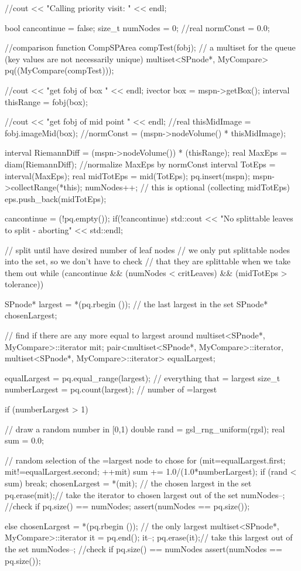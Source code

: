 \begin{DoxyCode}
{    
   //cout << "Calling priority visit: " << endl;

   bool cancontinue = false;
   size_t numNodes = 0;
   //real normConst = 0.0;
   
   //comparison function
   CompSPArea compTest(fobj);
   // a multiset for the queue (key values are not necessarily unique)
   multiset<SPnode*, MyCompare> pq((MyCompare(compTest)));

   //cout << "get fobj of box " << endl;
   ivector box = mspn->getBox();
   interval thisRange = fobj(box);
   
   //cout << "get fobj of mid point " << endl;
   //real thisMidImage = fobj.imageMid(box);
   //normConst = (mspn->nodeVolume() * thisMidImage);

   interval RiemannDiff = (mspn->nodeVolume()) * (thisRange);
   real MaxEps = diam(RiemannDiff);
   //normalize MaxEps by normConst
   interval TotEps = interval(MaxEps); 
   real midTotEps = mid(TotEps);
   pq.insert(mspn);
   mspn->collectRange(*this);
   numNodes++;
  // this is optional (collecting midTotEps)
   eps.push_back(midTotEps);
   
   cancontinue = (!pq.empty());
   if(!cancontinue) {
      std::cout << "No splittable leaves to split - aborting" << std::endl;
    } 

   // split until have desired number of leaf nodes
   // we only put splittable nodes into the set, so we don't have to check
   // that they are splittable when we take them out
   while (cancontinue && (numNodes < critLeaves) && (midTotEps > tolerance))
   {
    SPnode* largest = *(pq.rbegin ()); // the last largest in the set
    SPnode* chosenLargest;
    
    // find if there are any more equal to largest around
    multiset<SPnode*, MyCompare>::iterator mit;
    pair<multiset<SPnode*, MyCompare>::iterator,
       multiset<SPnode*, MyCompare>::iterator> equalLargest;

    equalLargest = pq.equal_range(largest); // everything that = largest
    size_t numberLargest = pq.count(largest); // number of =largest

    if (numberLargest > 1) {
       // draw a random number in [0,1)
       double rand = gsl_rng_uniform(rgsl);
       real sum = 0.0;

       // random selection of the =largest node to chose
       for (mit=equalLargest.first; mit!=equalLargest.second; ++mit) {
          sum += 1.0/(1.0*numberLargest);
          if (rand < sum) {
            break;
          }
       }
       chosenLargest = *(mit); // the chosen largest in the set
       pq.erase(mit);// take the iterator to chosen largest out of the set
       numNodes--; //check if pq.size() == numNodes;
       assert(numNodes == pq.size());
    }
    else {
       chosenLargest = *(pq.rbegin ()); // the only largest
       multiset<SPnode*, MyCompare>::iterator it = pq.end();
       it--;
       pq.erase(it);// take this largest out of the set
       numNodes--; //check if pq.size() == numNodes
       assert(numNodes == pq.size());
    }

}}
\end{DoxyCode}
